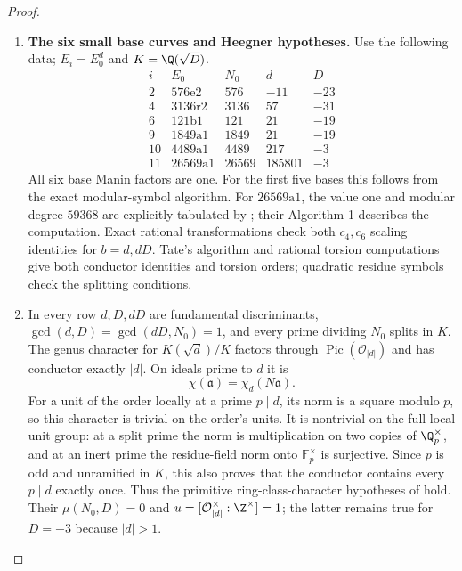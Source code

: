 \begin{proof}
\begin{enumerate}[label=\arabic*.,leftmargin=*]
\item \textbf{The six small base curves and Heegner hypotheses.}
Use the following data; $E_i=E_0^d$ and $K=\Q(\sqrt D)$.
\[
\begin{array}{c|c|r|r|r}
 i&E_0&N_0&d&D\\\hline
 2&576\mathrm e2&576&-11&-23\\
 4&3136\mathrm r2&3136&57&-31\\
 6&121\mathrm b1&121&21&-19\\
 9&1849\mathrm a1&1849&21&-19\\
 10&4489\mathrm a1&4489&217&-3\\
 11&26569\mathrm a1&26569&185801&-3
\end{array}
\]
All six base Manin factors are one. For the first five bases this follows from the exact
modular-symbol algorithm. For $26569\mathrm a1$, the value one and modular degree
$59368$ are explicitly tabulated by
\citet[Appendix B, p.~102, unnumbered $26569\mathrm a1/26569\mathrm a2$
block]{CgzBelabas2019}; their Algorithm 1 describes the computation.
Exact rational transformations check both $c_4,c_6$ scaling
identities for $b=d,dD$. Tate's algorithm and rational torsion
computations give both conductor identities and torsion orders;
quadratic residue symbols check the splitting conditions.

\item In every row $d,D,dD$ are fundamental discriminants,
$\gcd(d,D)=\gcd(dD,N_0)=1$, and every prime dividing $N_0$ splits
in $K$. The genus character for $K(\sqrt d)/K$ factors through
$\operatorname{Pic}(\mathcal O_{|d|})$ and has conductor exactly
$|d|$. On ideals prime to $d$ it is
\[
 \chi(\mathfrak a)=\chi_d(N\mathfrak a).
\]
For a unit of the order locally at a prime $p\mid d$, its norm is
a square modulo $p$, so this character is trivial on the order's
units. It is nontrivial on the full local unit group: at a split
prime the norm is multiplication on two copies of $\Q_p^\times$,
and at an inert prime the residue-field norm onto $\mathbb F_p^\times$
is surjective. Since $p$ is odd and unramified in $K$, this also
proves that the conductor contains every $p\mid d$ exactly once.
Thus the primitive ring-class-character hypotheses of
\citet[Theorem 1.1, pp.~2524--2525]{CgzCai2014} hold. Their
$\mu(N_0,D)=0$ and
$u=[\mathcal O_{|d|}^{\times}:\Z^{\times}]=1$; the latter remains
true for $D=-3$ because $|d|>1$.


\end{enumerate}
\end{proof}
